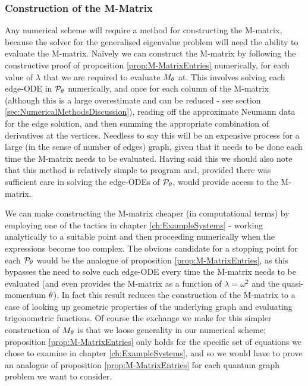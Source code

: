\subsubsection{Construction of the M-Matrix} \label{sec:ConcFutureConstructM}
Any numerical scheme will require a method for constructing the M-matrix, because the solver for the generalised eigenvalue problem will need the ability to evaluate the M-matrix.
Na\"ively we can construct the M-matrix by following the constructive proof of proposition \ref{prop:M-MatrixEntries} numerically, for each value of $\lambda$ that we are required to evaluate $M_{\theta}$ at.
This involves solving each edge-ODE in $\mathcal{P}_{\theta}$ numerically, and once for each column of the M-matrix (although this is a large overestimate and can be reduced - see section \ref{sec:NumericalMethodsDiscussion}), reading off the approximate Neumann data for the edge solution, and then summing the appropriate combination of derivatives at the vertices.
Needless to say this will be an expensive process for a large (in the sense of number of edges) graph, given that it needs to be done each time the M-matrix needs to be evaluated.
Having said this we should also note that this method is relatively simple to program and, provided there was sufficient care in solving the edge-ODEs of $\mathcal{P}_{\theta}$, would provide access to the M-matrix. \newline

We can make constructing the M-matrix cheaper (in computational terms) by employing one of the tactics in chapter \ref{ch:ExampleSystems} - working analytically to a suitable point and then proceeding numerically when the expressions become too complex.
The obvious candidate for a stopping point for each $\mathcal{P}_{\theta}$ would be the analogue of proposition \ref{prop:M-MatrixEntries}, as this bypasses the need to solve each edge-ODE every time the M-matrix needs to be evaluated (and even provides the M-matrix as a function of $\lambda=\omega^2$ and the quasi-momentum $\theta$).
In fact this result reduces the construction of the M-matrix to a case of looking up geometric properties of the underlying graph and evaluating trigonometric functions.
Of course the exchange we make for this simpler construction of $M_{\theta}$ is that we loose generality in our numerical scheme; proposition \ref{prop:M-MatrixEntries} only holds for the specific set of equations we chose to examine in chapter \ref{ch:ExampleSystems}, and so we would have to prove an analogue of proposition \ref{prop:M-MatrixEntries} for each quantum graph problem we want to consider. \newline

